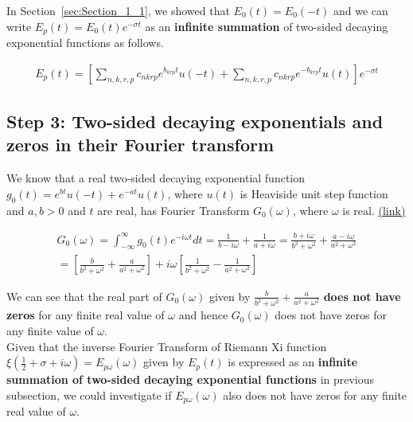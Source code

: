 \documentclass[11pt]{elsarticle}
\begin{document}
In Section~\ref{sec:Section_1_1}, we showed that $E_0(t)=E_0(-t)$ and we can write $E_p(t) = E_{0}(t) e^{-\sigma t} $ as an\textbf{ infinite summation} of two-sided decaying exponential functions as follows.

\begin{eqnarray*}\label{app_B1_eq_2}   
E_p(t)=   [ \displaystyle\sum\limits_{n,k,r,p}  c_{nkrp} e^{b_{krp} t} u(-t) + \displaystyle\sum\limits_{n,k,r,p}  c_{nkrp} e^{-b_{krp} t} u(t)  ] e^{-\sigma t}
\end{eqnarray*}
\begin{equation} \end{equation}


\subsection{\label{sec:Section_1_3} \textbf{Step 3: Two-sided decaying exponentials and zeros in their Fourier transform} \protect\\  \lowercase{} }


We know that a real two-sided decaying exponential function $g_0(t) = e^{b t} u(-t) +  e^{-a t} u(t) $, where $u(t)$ is Heaviside unit step function and $a, b > 0$ and $t$ are real, has Fourier Transform $G_0(\omega)$, where $\omega$ is real. \href{https://web.stanford.edu/class/ee102/lectures/fourtran#page=6}{(link)}


\begin{eqnarray*}\label{sec_0_1_eq_1_1}  
G_0(\omega) = \int_{-\infty}^{\infty} g_0(t) e^{-i \omega t} dt =  \frac{1}{b - i \omega} + \frac{1}{a + i \omega} = \frac{b + i \omega}{b^{2} +  \omega^{2} } + \frac{a - i \omega}{a^{2} +  \omega^{2}} \\
= [ \frac{b}{b^{2} +  \omega^{2} } + \frac{a }{a^{2} +  \omega^{2}} ]  +  i \omega [  \frac{1}{b^{2} +  \omega^{2}} - \frac{1}{a^{2} +  \omega^{2} } ]
\end{eqnarray*}
\begin{equation} \end{equation}

We can see that the real part of $G_0(\omega)$ given by $\frac{b}{b^{2} +  \omega^{2} } + \frac{a }{a^{2} +  \omega^{2}} $ \textbf{does not have zeros} for any  finite real value of $\omega$ and hence $G_0(\omega)$ does not have zeros for any finite value of $\omega$. \\

Given that the inverse Fourier Transform of Riemann Xi function  $\xi(\frac{1}{2}+ \sigma + i \omega)=E_{p\omega}(\omega)$ given by $E_p(t)$ is expressed as an \textbf{infinite summation of two-sided decaying exponential functions }in previous subsection, we could investigate if $E_{p\omega}(\omega)$ also does not have zeros for any  finite real value of $\omega$.
\end{document}
